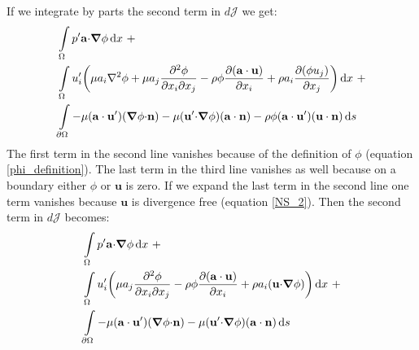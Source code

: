 \documentclass[12pt, a4paper]{article}
\begin{document}
    If we integrate by parts the second term in $d \mathcal{J}$ we get:
    \begin{equation}
    \begin{split}
        &\int\limits_{\Omega}{p' \mathbf{a \cdot} \boldsymbol{\nabla} \phi} \, \mathrm{d}x \ + \\
        &\int\limits_{\Omega}u'_i \bigg{(}
            {\mu a_i \nabla^2 \phi} + 
            {\mu a_j \frac{\partial^2 \phi}{\partial x_i \partial x_j}}  - 
            {\rho \phi \frac{\partial (\mathbf{a \cdot u})}{\partial x_i}} + 
            {\rho a_i \frac{\partial (\phi u_j)}{\partial x_j}}
        \bigg{)}\, \mathrm{d}x \ + \\
        &\int\limits_{\partial \Omega}{-\mu (\mathbf{a \cdot u'}) (\boldsymbol{\nabla} \phi \mathbf{\cdot n})} - 
            {\mu (\mathbf{u' \cdot} \boldsymbol{\nabla} \phi) (\mathbf{a \cdot n})} - 
            {\rho \phi (\mathbf{a \cdot u'}) (\mathbf{u \cdot n})}
        \, \mathrm{d}s
    \end{split}
    \end{equation}
    The first term in the second line vanishes because of the definition of $\phi$ (equation \ref{phi_definition}). The last term in the third line vanishes as well because on a boundary either $\phi$ or $\mathbf{u}$ is zero. If we expand the last term in the second line one term vanishes because $\mathbf{u}$ is divergence free (equation \ref{NS_2}). Then the second term in $d \mathcal{J}$ becomes:
    \begin{equation} \label{cost_change_term_2}
    \begin{split}
        &\int\limits_{\Omega}{p' \mathbf{a \cdot} \boldsymbol{\nabla} \phi} \, \mathrm{d}x \ + \\
        &\int\limits_{\Omega}u'_i \bigg{(}
            {\mu a_j \frac{\partial^2 \phi}{\partial x_i \partial x_j}}  - 
            {\rho \phi \frac{\partial (\mathbf{a \cdot u})}{\partial x_i}} +
            {\rho a_i (\mathbf{u \cdot} \boldsymbol{\nabla} \phi)}
        \bigg{)}\, \mathrm{d}x \ + \\
        &\int\limits_{\partial \Omega}{-\mu (\mathbf{a \cdot u'}) (\boldsymbol{\nabla} \phi \mathbf{\cdot n})} - 
            {\mu (\mathbf{u' \cdot} \boldsymbol{\nabla} \phi) (\mathbf{a \cdot n})}
        \, \mathrm{d}s
    \end{split}
    \end{equation}
    
\end{document}
